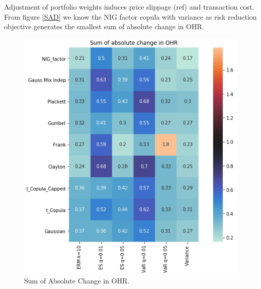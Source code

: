 Adjustment of portfolio weights induces price slippage (ref) and transaction cost.
From figure \ref{SAD} we know the NIG factor copula with variance as risk reduction objective generates the smallest
sum of absolute change in OHR.

\begin{figure}[!th]
   \centering
   \includegraphics[width=\textwidth]{_pics/Sum of absolute change in OHR.png}
   \caption{Sum of Absolute Change in OHR.
   }
   \label{fig:SAD}
\end{figure}


